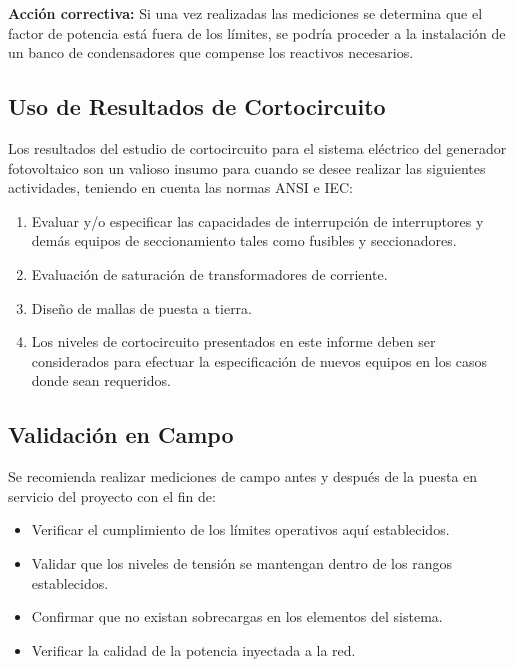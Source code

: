\textbf{Acción correctiva:} Si una vez realizadas las mediciones se determina que el factor de potencia está fuera de los límites, se podría proceder a la instalación de un banco de condensadores que compense los reactivos necesarios.

\subsection{Uso de Resultados de Cortocircuito}

Los resultados del estudio de cortocircuito para el sistema eléctrico del generador fotovoltaico son un valioso insumo para cuando se desee realizar las siguientes actividades, teniendo en cuenta las normas ANSI e IEC:

\begin{enumerate}
    \item Evaluar y/o especificar las capacidades de interrupción de interruptores y demás equipos de seccionamiento tales como fusibles y seccionadores.
    
    \item Evaluación de saturación de transformadores de corriente.
    
    \item Diseño de mallas de puesta a tierra.
    
    \item Los niveles de cortocircuito presentados en este informe deben ser considerados para efectuar la especificación de nuevos equipos en los casos donde sean requeridos.
\end{enumerate}

\subsection{Validación en Campo}

Se recomienda realizar mediciones de campo antes y después de la puesta en servicio del proyecto con el fin de:

\begin{itemize}
    \item Verificar el cumplimiento de los límites operativos aquí establecidos.
    
    \item Validar que los niveles de tensión se mantengan dentro de los rangos establecidos.
    
    \item Confirmar que no existan sobrecargas en los elementos del sistema.
    
    \item Verificar la calidad de la potencia inyectada a la red.
\end{itemize}


